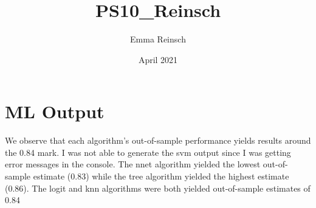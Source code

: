 \documentclass{article}
\title{PS10_Reinsch}
\author{Emma Reinsch}
\date{April 2021}
\begin{document}

\section{ML Output}


We observe that each algorithm's out-of-sample performance yields results around the 0.84 mark. I was not able to generate the svm output since I was getting error messages in the console. The nnet algorithm yielded the lowest out-of-sample estimate (0.83) while the tree algorithm yielded the highest estimate (0.86). The logit and knn algorithms were both yielded out-of-sample estimates of 0.84
\end{document}
